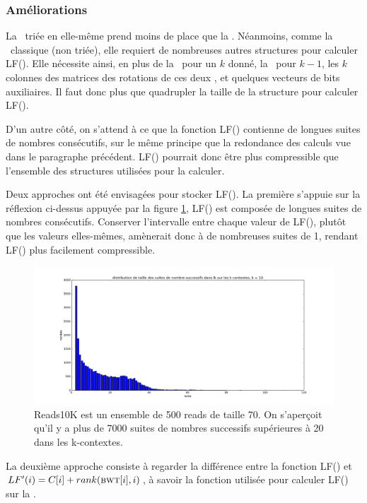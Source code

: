 \subsubsection{Améliorations}
La \kbwt\ triée en elle-même prend moins de place que la \bwt. Néanmoins, comme la \kbwt\ classique (non triée), elle requiert de nombreuses autres structures pour calculer LF(). Elle nécessite ainsi, en plus de la \kbwt\ pour un $k$ donné, la \kbwt\ pour $k-1$, les $k$ colonnes des matrices des rotations de ces deux \kbwt, et quelques vecteurs de bits auxiliaires. Il faut donc plus que quadrupler la taille de la structure pour calculer LF().

D'un autre côté, on s'attend à ce que la fonction LF() contienne de longues suites de nombres consécutifs, sur le même principe que la redondance des calculs vue dans le paragraphe précédent. LF() pourrait donc être plus compressible que l'ensemble des structures utilisées pour la calculer.

Deux approches ont été envisagées pour stocker LF(). La première s'appuie sur la réflexion ci-dessus appuyée par la figure \ref{suitesLF}, LF() est composée de longues suites de nombres consécutifs. Conserver l'intervalle entre chaque valeur de LF(), plutôt que les valeurs elles-mêmes, amènerait donc à de nombreuses suites de 1, rendant LF() plus facilement compressible.

\begin{figure}[!ht]
    \center
    \includegraphics[scale = 0.3]{./images/suitesLFreads10K_k10.png}
    \caption{Reads10K est un ensemble de 500 reads de taille 70. On s'aperçoit qu'il y a plus de 7000 suites de nombres successifs supérieures à 20 dans les k-contextes.}
    \label{suitesLF}
\end{figure}

La deuxième approche consiste à regarder la différence entre la fonction LF() et $LF'(i) = C[i] + rank(\textsc{bwt}[i], i)$, à savoir la fonction utilisée pour calculer LF() sur la \bwt.




